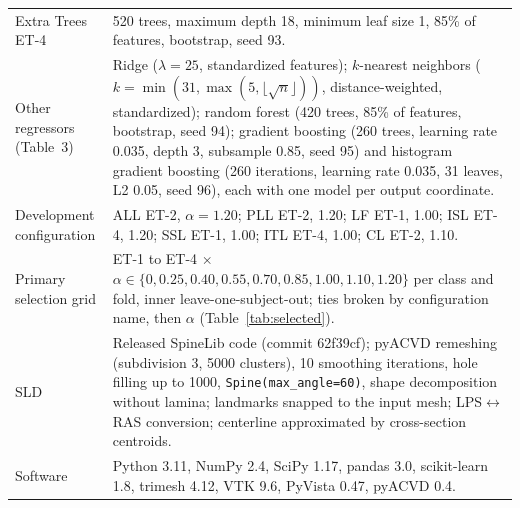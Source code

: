 \documentclass[10pt,a4paper]{article}
\begin{document}
\begin{longtable}{@{}P{40mm}P{118mm}@{}}
Extra Trees ET-4 & 520 trees, maximum depth 18, minimum leaf size 1, 85\% of features, bootstrap, seed 93. \\
Other regressors (Table~3) & Ridge ($\lambda=25$, standardized features); $k$-nearest neighbors ($k=\min(31,\max(5,\lfloor\sqrt{n}\rfloor))$, distance-weighted, standardized); random forest (420 trees, 85\% of features, bootstrap, seed 94); gradient boosting (260 trees, learning rate 0.035, depth 3, subsample 0.85, seed 95) and histogram gradient boosting (260 iterations, learning rate 0.035, 31 leaves, L2 0.05, seed 96), each with one model per output coordinate. \\
Development configuration & ALL ET-2, $\alpha=1.20$; PLL ET-2, 1.20; LF ET-1, 1.00; ISL ET-4, 1.20; SSL ET-1, 1.00; ITL ET-4, 1.00; CL ET-2, 1.10. \\
Primary selection grid & ET-1 to ET-4 $\times$ $\alpha\in\{0,0.25,0.40,0.55,0.70,0.85,1.00,1.10,1.20\}$ per class and fold, inner leave-one-subject-out; ties broken by configuration name, then $\alpha$ (Table~\ref{tab:selected}). \\
SLD & Released SpineLib code (commit 62f39cf); pyACVD remeshing (subdivision 3, 5000 clusters), 10 smoothing iterations, hole filling up to 1000, \texttt{Spine(max\_angle=60)}, shape decomposition without lamina; landmarks snapped to the input mesh; LPS$\leftrightarrow$RAS conversion; centerline approximated by cross-section centroids. \\
Software & Python 3.11, NumPy 2.4, SciPy 1.17, pandas 3.0, scikit-learn 1.8, trimesh 4.12, VTK 9.6, PyVista 0.47, pyACVD 0.4. \\
\bottomrule
\end{longtable}
\end{document}
